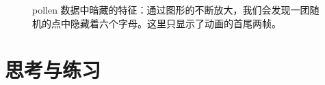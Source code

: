 \documentclass[
  b5paper,
  UTF8,twoside]{book}
\begin{document}
\begin{figure}

{\centering {}

}

\caption[pollen 数据中暗藏的特征]{pollen 数据中暗藏的特征：通过图形的不断放大，我们会发现一团随机的点中隐藏着六个字母。这里只显示了动画的首尾两帧。}\label{fig:animation-pollen}
\end{figure}





\section{思考与练习}\label{ux601dux8003ux4e0eux7ec3ux4e60-4}
\end{document}
